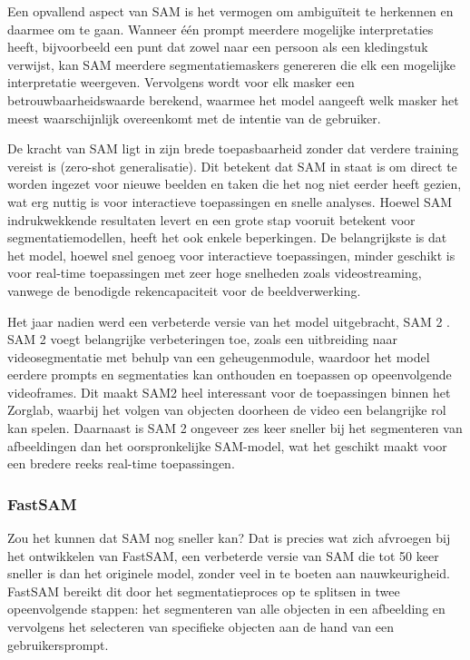 Een opvallend aspect van SAM is het vermogen om ambiguïteit te herkennen en daarmee om te gaan. 
Wanneer één prompt meerdere mogelijke interpretaties heeft, bijvoorbeeld een punt dat zowel naar een persoon als een kledingstuk verwijst, kan SAM meerdere segmentatiemaskers genereren die elk een mogelijke interpretatie weergeven. 
Vervolgens wordt voor elk masker een betrouwbaarheidswaarde berekend, waarmee het model aangeeft welk masker het meest waarschijnlijk overeenkomt met de intentie van de gebruiker.

De kracht van SAM ligt in zijn brede toepasbaarheid zonder dat verdere training vereist is (zero-shot generalisatie). 
Dit betekent dat SAM in staat is om direct te worden ingezet voor nieuwe beelden en taken die het nog niet eerder heeft gezien, wat erg nuttig is voor interactieve toepassingen en snelle analyses.
Hoewel SAM indrukwekkende resultaten levert en een grote stap vooruit betekent voor segmentatiemodellen, heeft het ook enkele beperkingen. 
De belangrijkste is dat het model, hoewel snel genoeg voor interactieve toepassingen, minder geschikt is voor real-time toepassingen met zeer hoge snelheden zoals videostreaming, vanwege de benodigde rekencapaciteit voor de beeldverwerking.

Het jaar nadien werd een verbeterde versie van het model uitgebracht, SAM 2 \autocite{Ravi2024}. 
SAM 2 voegt belangrijke verbeteringen toe, zoals een uitbreiding naar videosegmentatie met behulp van een geheugenmodule, waardoor het model eerdere prompts en segmentaties kan onthouden en toepassen op opeenvolgende videoframes. 
Dit maakt SAM2 heel interessant voor de toepassingen binnen het Zorglab, waarbij het volgen van objecten doorheen de video een belangrijke rol kan spelen.
Daarnaast is SAM 2 ongeveer zes keer sneller bij het segmenteren van afbeeldingen dan het oorspronkelijke SAM-model, wat het geschikt maakt voor een bredere reeks real-time toepassingen.

\subsubsection{FastSAM}

Zou het kunnen dat SAM nog sneller kan? 
Dat is precies wat \textcite{Zhao2023} zich afvroegen bij het ontwikkelen van FastSAM, een verbeterde versie van SAM die tot 50 keer sneller is dan het originele model, zonder veel in te boeten aan nauwkeurigheid.
FastSAM bereikt dit door het segmentatieproces op te splitsen in twee opeenvolgende stappen: het segmenteren van alle objecten in een afbeelding en vervolgens het selecteren van specifieke objecten aan de hand van een gebruikersprompt.

